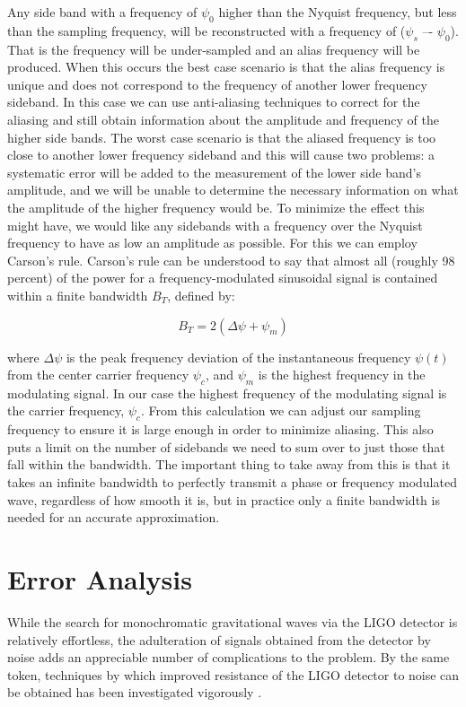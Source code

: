 \documentclass[onecolumn, groupedaddress, 10pt]{revtex4-1}
\begin{document}
Any side band with a frequency of $\psi_0$ higher than the Nyquist frequency, but less than the sampling frequency, will be reconstructed with a frequency of ($\psi_s$ –- $\psi_0$). That is the frequency will be under-sampled and an alias frequency will be produced. When this occurs the best case scenario is that the alias frequency is unique and does not correspond to the frequency of another lower frequency sideband. In this case we can use anti-aliasing techniques to correct for the aliasing and still obtain information about the amplitude and frequency of the higher side bands. The worst case scenario is that the aliased frequency is too close to another lower frequency sideband and this will cause two problems: a systematic error will be added to the measurement of the lower side band’s amplitude, and we will be unable to determine the necessary information on what the amplitude of the higher frequency would be. To minimize the effect this might have, we would like any sidebands with a frequency over the Nyquist frequency to have as low an amplitude as possible. For this we can employ Carson’s rule. Carson’s rule can be understood to say that almost all (roughly 98 percent) of the power for a frequency-modulated sinusoidal signal is contained within a finite bandwidth $B_T$, defined by:

\begin{equation}
B_T = 2(\Delta\psi + \psi_m)
\end{equation}

where $\Delta\psi$ is the peak frequency deviation of the instantaneous frequency $\psi(t)$ from the center carrier frequency $\psi_c$, and $\psi_m$ is the highest frequency in the modulating signal. In our case the highest frequency of the modulating signal is the carrier frequency, $\psi_c$. From this calculation we can adjust our sampling frequency to ensure it is large enough in order to minimize aliasing. This also puts a limit on the number  of sidebands we need to sum over to just those that fall within the bandwidth.  The important thing to take away from this is that it takes an infinite bandwidth to perfectly transmit a phase or frequency modulated wave, regardless of how smooth it is, but in practice only a finite bandwidth is needed for an accurate approximation.



\section{Error Analysis}
While the search for monochromatic gravitational waves via the LIGO detector is relatively effortless, the adulteration of signals obtained from the detector by noise adds an appreciable number of complications to the problem. By the same token, techniques by which improved resistance of the LIGO detector to noise can be obtained has been investigated vigorously \citep{abramovici1996improved} \citep{aasi2013enhanced}.
\end{document}

